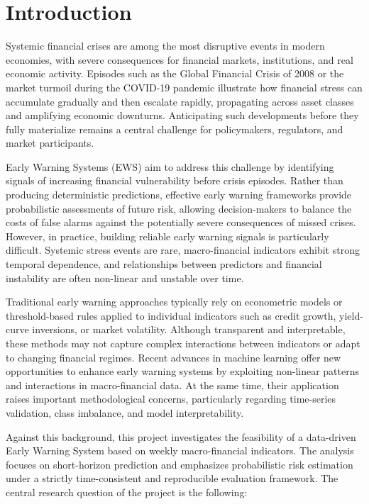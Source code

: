 \documentclass[11pt,a4paper]{article}
\begin{document}
\newpage
\tableofcontents
\newpage

\section{Introduction}
\label{sec:introduction}

Systemic financial crises are among the most disruptive events in modern economies, with severe consequences for financial markets, institutions, and real economic activity. Episodes such as the Global Financial Crisis of 2008 or the market turmoil during the COVID-19 pandemic illustrate how financial stress can accumulate gradually and then escalate rapidly, propagating across asset classes and amplifying economic downturns. Anticipating such developments before they fully materialize remains a central challenge for policymakers, regulators, and market participants.

Early Warning Systems (EWS) aim to address this challenge by identifying signals of increasing financial vulnerability before crisis episodes. Rather than producing deterministic predictions, effective early warning frameworks provide probabilistic assessments of future risk, allowing decision-makers to balance the costs of false alarms against the potentially severe consequences of missed crises. However, in practice, building reliable early warning signals is particularly difficult. Systemic stress events are rare, macro-financial indicators exhibit strong temporal dependence, and relationships between predictors and financial instability are often non-linear and unstable over time.

Traditional early warning approaches typically rely on econometric models or threshold-based rules applied to individual indicators such as credit growth, yield-curve inversions, or market volatility. Although transparent and interpretable, these methods may not capture complex interactions between indicators or adapt to changing financial regimes. Recent advances in machine learning offer new opportunities to enhance early warning systems by exploiting non-linear patterns and interactions in macro-financial data. At the same time, their application raises important methodological concerns, particularly regarding time-series validation, class imbalance, and model interpretability.

Against this background, this project investigates the feasibility of a data-driven Early Warning System based on weekly macro-financial indicators. The analysis focuses on short-horizon prediction and emphasizes probabilistic risk estimation under a strictly time-consistent and reproducible evaluation framework. The central research question of the project is the following:
\end{document}
